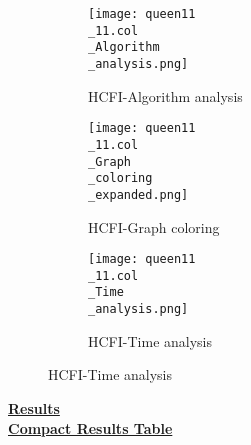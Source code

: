 \documentclass[10pt]{article}
\begin{document}
\graphicspath{{./Core1/Solutions/HCFI/queen11\_11.col}}
\begin{figure}[H]
\begin{subfigure}{.33\textwidth}
  \centering
  \texttt{[image: queen11\\\_11.col\\\_Algorithm\\\_analysis.png]}
  \caption{HCFI-Algorithm analysis}
   \label{fig:subfig1}
\end{subfigure}%
\begin{subfigure}{.33\textwidth}
  \centering
  \texttt{[image: queen11\\\_11.col\\\_Graph\\\_coloring\\\_expanded.png]}
  \caption{HCFI-Graph coloring}
  \label{fig:subfig2}
\end{subfigure}
\begin{subfigure}{.33\textwidth}
  \centering
  \texttt{[image: queen11\\\_11.col\\\_Time\\\_analysis.png]}
  \caption{HCFI-Time analysis}
  \end{subfigure}
\end{figure}
\vspace{2cm}
\begin{center}
\hyperlink{page.8}{\textbf{Results}}\\
\vspace{0.5cm}
\hyperlink{page.71}{\textbf{Compact Results Table}}
\end{center}
\pagebreak
\end{document}
